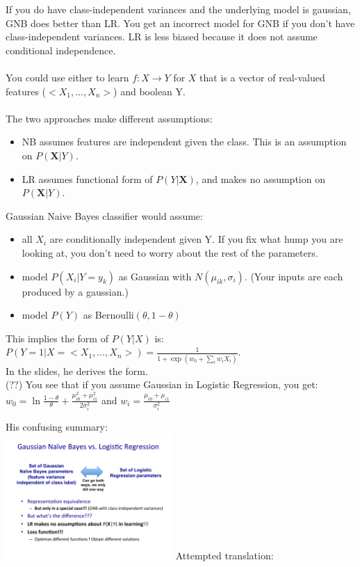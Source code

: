 If you do have class-independent variances and the underlying model is gaussian, GNB does better than LR.
You get an incorrect model for GNB if you don't have class-independent variances.  %
LR is less biased because it does not assume conditional independence.  %
 \hfill \\  \hfill \\

You could use either to learn $ f: X \rightarrow Y$ for $X$ that is a vector of real-valued features ($< X_1, \dots, X_n >$) and boolean Y. \hfill \\ \hfill \\

The two approaches make different assumptions:   \hfill \\
\begin{itemize}
	\item NB assumes features are independent given the class.  This is an assumption on $P(\bm{X} | Y)$.
	\item LR assumes functional form of $P(Y|\bm{X})$, and makes no assumption on $P(\bm{X} | Y)$.
\end{itemize}

Gaussian Naive Bayes classifier would assume: \hfill \\
\begin{itemize}
	\item all $X_i$ are conditionally independent given Y.  
		If you fix what hump you are looking at, you don't need to worry about the rest of the parameters. 
	\item model $P(X_i | Y = y_k)$ as Gaussian with $N(\mu_{ik}, \sigma_i)$.  (Your inputs are each produced by a gaussian.)
	\item model $P(Y)$ as Bernoulli$(\theta, 1-\theta)$
\end{itemize} 
This implies the form of $P(Y|X)$ is:
$\displaystyle P(Y=1 | X= < X_1, \dots, X_n >) = \frac{1}{1 + \exp(w_0 + \sum_i w_i X_i)}$. \hfill \\
In the slides, he derives the form.   \hfill \\
(??)  You see that if you assume Gaussian in Logistic Regression, you get: \hfill \\
 $w_0 = \ln \frac{1 - \theta}{\theta} + \frac{\mu_{i0}^2 + \mu_{i1}^2}{2 \sigma_i^2}$ and $w_i = \frac{\mu_{i0} + \mu_{i1}}{\sigma_i^2}$
 
 His confusing summary: \hfill \\
 \includegraphics[width=2.5in]{figures/GNB_vs_LR.pdf}
 Attempted translation: 
 

